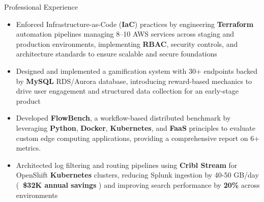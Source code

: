 \documentclass{resume}
\begin{document}
 \begin{experienceSection}{Professional Experience}

    \experienceItem[
        company={DriverAI LLC},
        location={Remote},
        position={Software Engineer - AWS Lead},
        duration={Dec 2025 - Present}
    ]
    \begin{itemize}
        \itemsep -6pt {}
        \item Enforced Infrastructure-as-Code (\textbf{IaC}) practices by engineering \textbf{Terraform} automation pipelines managing 8–10 AWS services across staging and production environments, implementing \textbf{RBAC}, security controls, and architecture standards to ensure scalable and secure foundations
        \item Designed and implemented a gamification system with 30+ endpoints backed by \textbf{MySQL} RDS/Aurora database, introducing reward-based mechanics to drive user engagement and structured data collection for an early-stage product
    \end{itemize}

    \experienceItem[
        company={Arizona State University},
        location={Remote},
        position={Research Assistant, VISA Lab},
        duration={Jun 2025 - Dec 2025}
    ]
    \begin{itemize}
        \itemsep -6pt {}
        \item Developed \textbf{FlowBench}, a workflow-based distributed benchmark by leveraging \textbf{Python}, \textbf{Docker}, \textbf{Kubernetes}, and \textbf{FaaS} principles to evaluate custom edge computing applications, providing a comprehensive report on 6+ metrics.
    \end{itemize}


    \experienceItem[
        company={Arch Mortgage Insurance},
        location={Greensboro, NC},
        position={Site Reliability Engineer (SRE) Intern},
        duration={Jun 2024 - Aug 2024}
    ]
    \begin{itemize}
        \itemsep -6pt {}
        \item Architected log filtering and routing pipelines using \textbf{Cribl Stream} for OpenShift \textbf{Kubernetes} clusters, reducing Splunk ingestion by 40-50 GB/day (\textbf{~\$32K annual savings} ) and improving search performance by \textbf{20\%} 
  across environments
        
    \end{itemize}


\end{experienceSection}
\end{document}
